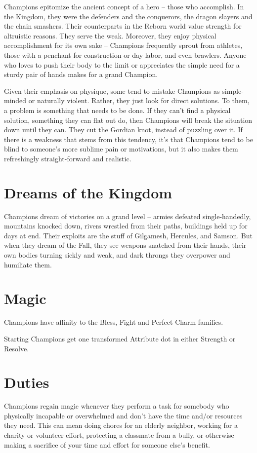 \newpage{}

Champions epitomize the ancient concept of a hero -- those who accomplish. In the Kingdom, they were the defenders and the conquerors, the dragon slayers and the chain smashers. Their counterparts in the Reborn world value strength for altruistic reasons. They serve the weak. Moreover, they enjoy physical accomplishment for its own sake -- Champions frequently sprout from athletes, those with a penchant for construction or day labor, and even brawlers. Anyone who loves to push their body to the limit or appreciates the simple need for a sturdy pair of hands makes for a grand Champion.

Given their emphasis on physique, some tend to mistake Champions as simple-minded or naturally violent. Rather, they just look for direct solutions. To them, a problem is something that needs to be done. If they can't find a physical solution, something they can flat out do, then Champions will break the situation down until they can. They cut the Gordian knot, instead of puzzling over it. If there is a weakness that stems from this tendency, it's that Champions tend to be blind to someone's more sublime pain or motivations, but it also makes them refreshingly straight-forward and realistic. 

\section*{Dreams of the Kingdom}

Champions dream of victories on a grand level -- armies defeated single-handedly, mountains knocked down, rivers wrestled from their paths, buildings held up for days at end. Their exploits are the stuff of Gilgamesh, Hercules, and Samson. But when they dream of the Fall, they see weapons snatched from their hands, their own bodies turning sickly and weak, and dark throngs they overpower and humiliate them. 

\section*{Magic}
Champions have affinity to the Bless, Fight and Perfect Charm families.

Starting Champions get one transformed Attribute dot in either Strength or Resolve. 

\section*{Duties}
Champions regain magic whenever they perform a task for somebody who physically incapable or overwhelmed and don't have the time and/or resources they need. This can mean doing chores for an elderly neighbor, working for a charity or volunteer effort, protecting a classmate from a bully, or otherwise making a sacrifice of your time and effort for someone else's benefit. 

